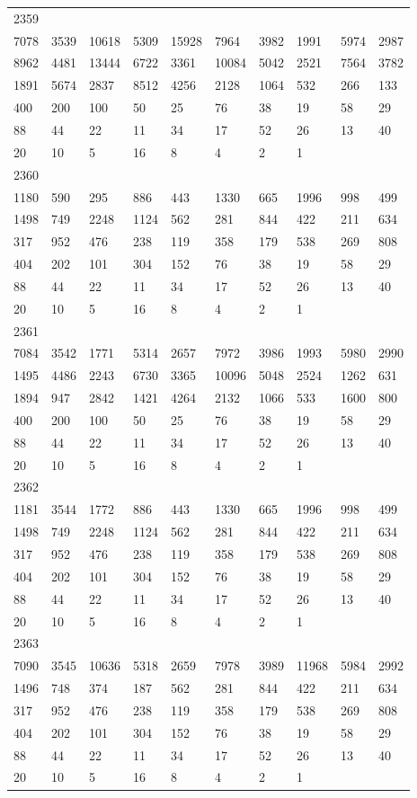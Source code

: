 \begin{longtable}{*{10}{l}}
2359&&&&&&&&&\\
7078& 3539& 10618& 5309& 15928& 7964& 3982& 1991& 5974& 2987\\
8962& 4481& 13444& 6722& 3361& 10084& 5042& 2521& 7564& 3782\\
1891& 5674& 2837& 8512& 4256& 2128& 1064& 532& 266& 133\\
400& 200& 100& 50& 25& 76& 38& 19& 58& 29\\
88& 44& 22& 11& 34& 17& 52& 26& 13& 40\\
20& 10& 5& 16& 8& 4& 2& 1& \\

2360&&&&&&&&&\\
1180& 590& 295& 886& 443& 1330& 665& 1996& 998& 499\\
1498& 749& 2248& 1124& 562& 281& 844& 422& 211& 634\\
317& 952& 476& 238& 119& 358& 179& 538& 269& 808\\
404& 202& 101& 304& 152& 76& 38& 19& 58& 29\\
88& 44& 22& 11& 34& 17& 52& 26& 13& 40\\
20& 10& 5& 16& 8& 4& 2& 1& \\

2361&&&&&&&&&\\
7084& 3542& 1771& 5314& 2657& 7972& 3986& 1993& 5980& 2990\\
1495& 4486& 2243& 6730& 3365& 10096& 5048& 2524& 1262& 631\\
1894& 947& 2842& 1421& 4264& 2132& 1066& 533& 1600& 800\\
400& 200& 100& 50& 25& 76& 38& 19& 58& 29\\
88& 44& 22& 11& 34& 17& 52& 26& 13& 40\\
20& 10& 5& 16& 8& 4& 2& 1& \\

2362&&&&&&&&&\\
1181& 3544& 1772& 886& 443& 1330& 665& 1996& 998& 499\\
1498& 749& 2248& 1124& 562& 281& 844& 422& 211& 634\\
317& 952& 476& 238& 119& 358& 179& 538& 269& 808\\
404& 202& 101& 304& 152& 76& 38& 19& 58& 29\\
88& 44& 22& 11& 34& 17& 52& 26& 13& 40\\
20& 10& 5& 16& 8& 4& 2& 1& \\

2363&&&&&&&&&\\
7090& 3545& 10636& 5318& 2659& 7978& 3989& 11968& 5984& 2992\\
1496& 748& 374& 187& 562& 281& 844& 422& 211& 634\\
317& 952& 476& 238& 119& 358& 179& 538& 269& 808\\
404& 202& 101& 304& 152& 76& 38& 19& 58& 29\\
88& 44& 22& 11& 34& 17& 52& 26& 13& 40\\
20& 10& 5& 16& 8& 4& 2& 1& \\


\end{longtable}
